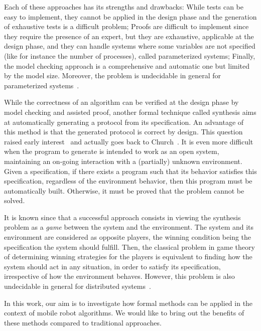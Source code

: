Each of these approaches has its strengths and drawbacks: While tests can be easy to implement, they cannot be applied in the design phase and the generation of exhaustive tests is a difficult problem; Proofs are difficult to implement since they require the presence of an expert, but they are exhaustive, applicable at the design phase, and
they can handle systems where some variables are not specified (like for instance the number of processes), called parameterized systems; 
Finally, the model checking approach is a comprehensive and automatic one but limited by the model size. 
Moreover, the problem is  undecidable in general for parameterized systems~\cite{apt.kozen.86}.


While the correctness of an algorithm can be verified at the design phase by model checking and assisted proof, 
another formal technique called synthesis aims at automatically generating a protocol from its specification. An advantage of this method is that the generated protocol is correct by design.
This question raised early interest~\cite{emersonclarke1981, MannaWolper84} and actually goes back to Church~\cite{Church62, BuchiLandweber69}. It is even more difficult when the program to generate is intended to work as an open system, maintaining an on-going interaction with a (partially) unknown environment. Given a specification, if there exists a program such that its behavior satisfies this specification, regardless of the environment behavior, then this program must be automatically built. Otherwise, it must be proved that the problem cannot be solved.

 It is known since \cite{BuchiLandweber69} that a successful approach consists in viewing the synthesis problem as a \emph{game} between the system and the environment. The system and its environment are considered as opposite players, the winning condition being the specification the system should fulfill. Then, the classical problem in game theory of determining winning strategies for the players is equivalent to finding how the system should act in any situation, in order to satisfy its specification, irrespective of how the environment behaves.
However, this problem is also undecidable in general for distributed systems~\cite{PnueliR90}. 
 \bigskip
 
 In this work, our aim is to investigate how formal methods can be applied in the context of mobile robot algorithms.
 We would like to bring out the benefits of these methods compared to traditional approaches.


